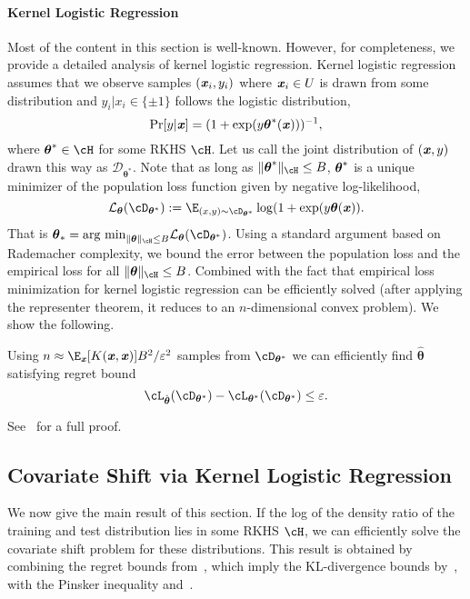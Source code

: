 \paragraph{Kernel Logistic Regression}
Most of the content in this section is well-known. However, for completeness, we provide a detailed analysis of kernel logistic regression. Kernel logistic regression assumes that we observe samples $(\boldsymbol{\mathit{x}}_i, y_i)$ where $\boldsymbol{\mathit{x}}_i \in U$ is drawn from some distribution and $y_i|x_i \in \{\pm 1\}$ follows the logistic distribution,
\begin{equation*}
    \Pr[y| \boldsymbol{\mathit{x}}] = (1 + \exp(y \boldsymbol{\theta}^*(\boldsymbol{\mathit{x}})))^{-1},
\end{equation*}
where $\boldsymbol{\theta}^* \in \cH$ for some RKHS $\cH$. Let us call the joint distribution of $(\boldsymbol{\mathit{x}},y)$ drawn this way as $\mathcal{D}_{\boldsymbol{\theta}^*}$. Note that as long as $\|\boldsymbol{\theta}^*\|_{\cH} \leq B$,  $\boldsymbol{\mathit{\theta}}^*$ is a unique minimizer of the population loss function given by negative log-likelihood,
\begin{equation*}
\mathcal{L}_{\boldsymbol{\theta}}(\cD_{\ttheta^*}) := \E_{(x,y) \sim \cD_{\boldsymbol{\theta}^*}} \log(1 + \exp(y \boldsymbol{\theta}(\xx)).
\end{equation*}
That is $\ttheta_* = \text{arg min}_{\|\ttheta\|_{\cH} \leq B} \mathcal{L}_{\ttheta}(\cD_{\ttheta^*})$. 
Using a standard argument based on Rademacher complexity, we bound the error between the population loss and the empirical loss for all $\|\ttheta\|_{\cH} \leq B$. Combined with the fact that empirical loss minimization for kernel logistic regression can be efficiently solved (after applying the representer theorem, it reduces to an $n$-dimensional convex problem). We show the following.
\begin{lemma}
\label{lem:kernel-logistic-regression-regret-bound}
    Using $n \approx \E_{\xx}[K(\xx, \xx)] B^2/\varepsilon^2$ samples from $\cD_{\boldsymbol{\theta}^*}$ we can efficiently find $\hat{\boldsymbol{\theta}}$ satisfying regret bound
    \begin{equation*}
        \cL_{\hat{\boldsymbol{\theta}}}(\cD_{\ttheta^*})  - \cL_{\boldsymbol{\theta}^*}(\cD_{\ttheta^*}) \leq \varepsilon.
    \end{equation*}
\end{lemma}

See~ for a full proof.

\subsection{Covariate Shift via Kernel Logistic Regression}
We now give the main result of this section. If the log of the density ratio of the training and test distribution lies in some RKHS $\cH$, we can efficiently solve the covariate shift problem for these distributions. This result is obtained by combining the regret bounds from~, which imply the KL-divergence bounds by~, with the Pinsker inequality and~.

